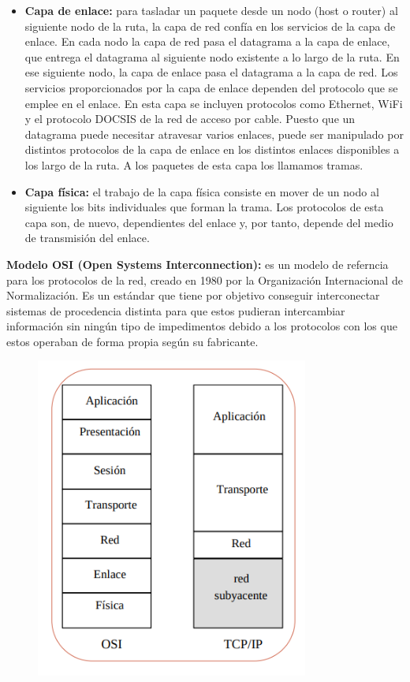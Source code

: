 \documentclass[a4paper,11pt]{article}
\begin{document}
\begin{itemize}
\item \textbf{Capa de enlace:} para tasladar un paquete desde un nodo (host o router) al siguiente nodo de la ruta, la capa de red confía en los servicios de la capa de enlace. En cada nodo la capa de red pasa el datagrama a la capa de enlace, que entrega el datagrama al siguiente nodo existente a lo largo de la ruta. En ese siguiente nodo, la capa de enlace pasa el datagrama a la capa de red. Los servicios proporcionados por la capa de enlace dependen del protocolo que se emplee en el enlace. En esta capa se incluyen protocolos como Ethernet, WiFi y el protocolo DOCSIS de la red de acceso por cable. Puesto que un datagrama puede necesitar atravesar varios enlaces, puede ser manipulado por distintos protocolos de la capa de enlace en los distintos enlaces disponibles a los largo de la ruta. A los paquetes de esta capa los llamamos tramas.

\item \textbf{Capa física:} el trabajo de la capa física consiste en mover de un nodo al siguiente los bits individuales que forman la trama. Los protocolos de esta capa son, de nuevo, dependientes del enlace y, por tanto, depende del medio de transmisión del enlace.
\end{itemize}

\textbf{Modelo OSI (Open Systems Interconnection):} es un modelo de referncia para los protocolos de la red, creado en 1980 por la Organización Internacional de Normalización. Es un estándar que tiene por objetivo conseguir interconectar sistemas de procedencia distinta para que estos pudieran intercambiar información sin ningún tipo de impedimentos debido a los protocolos con los que estos operaban de forma propia según su fabricante.

\begin{figure}[h]
\centering
\includegraphics[scale=1,width=0.8\textwidth]{modelo_osi.png}
\end{figure}
\end{document}
